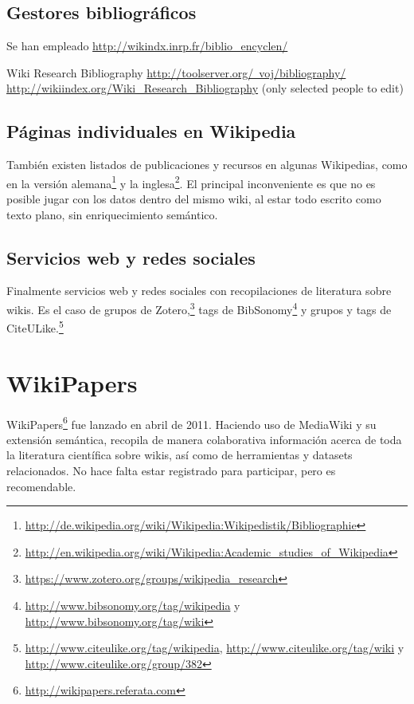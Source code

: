 \documentclass[11pt,twocolumn]{article}
\begin{document}
\subsection{Gestores bibliográficos}
Se han empleado \href{http://wikindx.inrp.fr/biblio_encyclen/}{http://wikindx.inrp.fr/biblio\_encyclen/}

Wiki Research Bibliography
\href{http://toolserver.org/~voj/bibliography/}{http://toolserver.org/~voj/bibliography/}
\href{http://wikiindex.org/Wiki_Research_Bibliography}{http://wikiindex.org/Wiki\_Research\_Bibliography}
(only selected people to edit)

\subsection{Páginas individuales en Wikipedia}
También existen listados de publicaciones y recursos en algunas Wikipedias, como en la versión alemana\footnote{\href{http://de.wikipedia.org/wiki/Wikipedia:Wikipedistik/Bibliographie}{http://de.wikipedia.org/wiki/Wikipedia:Wikipedistik/Bibliographie}} y la inglesa\footnote{\href{http://en.wikipedia.org/wiki/Wikipedia:Academic_studies_of_Wikipedia}{http://en.wikipedia.org/wiki/Wikipedia:Academic\_studies\_of\_Wikipedia}}. El principal inconveniente es que no es posible jugar con los datos dentro del mismo wiki, al estar todo escrito como texto plano, sin enriquecimiento semántico.

\subsection{Servicios web y redes sociales}
Finalmente servicios web y redes sociales con recopilaciones de literatura sobre wikis. Es el caso de grupos de Zotero,\footnote{\href{https://www.zotero.org/groups/wikipedia_research}{https://www.zotero.org/groups/wikipedia\_research}} tags de BibSonomy\footnote{\href{http://www.bibsonomy.org/tag/wikipedia}{http://www.bibsonomy.org/tag/wikipedia} y \href{http://www.bibsonomy.org/tag/wiki}{http://www.bibsonomy.org/tag/wiki}} y grupos y tags de CiteULike.\footnote{\href{http://www.citeulike.org/tag/wikipedia}{http://www.citeulike.org/tag/wikipedia}, \href{http://www.citeulike.org/tag/wiki}{http://www.citeulike.org/tag/wiki} y \href{http://www.citeulike.org/group/382}{http://www.citeulike.org/group/382}}

\section{WikiPapers}
WikiPapers\footnote{\href{http://wikipapers.referata.com}{http://wikipapers.referata.com}} fue lanzado en abril de 2011. Haciendo uso de MediaWiki y su extensión semántica, recopila de manera colaborativa información acerca de toda la literatura científica sobre wikis, así como de herramientas y datasets relacionados. No hace falta estar registrado para participar, pero es recomendable.
\end{document}
